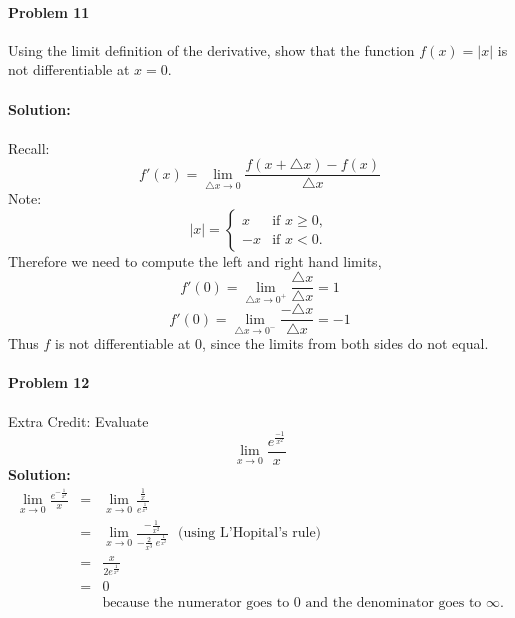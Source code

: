 \documentclass[a4paper,11pt]{article}
\begin{document}
\paragraph{Problem 11} Using the limit definition of the derivative, show
that the function $f(x) = |x|$ is not differentiable at $x = 0$. \\ \\
\textbf{Solution: } \\ \\
Recall: \\
\begin{displaymath}
f'(x) = \lim_{\triangle x \to 0}\frac{f(x+\triangle x) - f(x)}{\triangle x}
\end{displaymath}
Note: \\
\begin{equation}
|x|=
  \begin{cases}
    x & \text{if $x\ge0$}, \\
    -x & \text{if $x < 0$}.
  \end{cases}
\end{equation}
Therefore we need to compute the left and right hand limits,
\begin{displaymath}
f'(0) = \lim_{\triangle x \to 0^+}\frac{\triangle x}{\triangle x} = 1
\end{displaymath}
\begin{displaymath}
f'(0) = \lim_{\triangle x \to 0^-}\frac{-\triangle x}{\triangle x} = -1
\end{displaymath}
Thus $f$ is not differentiable at 0, since the limits from both sides do not
equal.

\newpage
\paragraph{Problem 12} Extra Credit: Evaluate
\begin{displaymath}
\lim_{x \to 0} \frac{e^{\frac{-1}{x^2}}}{x}
\end{displaymath}
\textbf{Solution: }
\begin{eqnarray*}
\lim_{x\rightarrow 0} \frac{e^{-\frac{1}{x^2}}}{x} 
&=& \lim_{x\rightarrow 0}\frac{\frac{1}{x}}{e^{\frac{1}{x^2}}} \\
&=& \lim_{x\rightarrow 0} \frac{-\frac{1}{x^2}}{-\frac{2}{x^3} ~ e^{\frac{1}{x^2}}}\mbox{~~(using L'Hopital's rule)}\\ 
&=& \frac{x}{2 e^\frac{1}{x^2}} \\
&=& 0 \\
&& \mbox{because the numerator goes to $0$ and the denominator goes to $\infty$.}
\end{eqnarray*}
\end{document}
